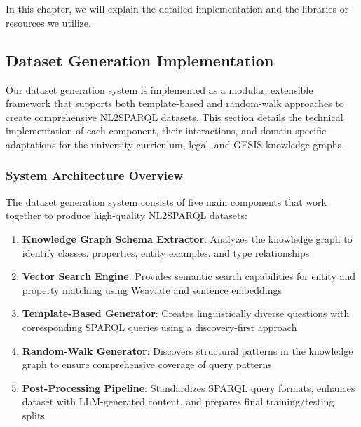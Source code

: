 \chapter{\babEmpat}
\label{bab:4}
In this chapter, we will explain the detailed implementation and the libraries or resources we utilize.

\section{Dataset Generation Implementation}

Our dataset generation system is implemented as a modular, extensible framework that supports both template-based and random-walk approaches to create comprehensive NL2SPARQL datasets. This section details the technical implementation of each component, their interactions, and domain-specific adaptations for the university curriculum, legal, and GESIS knowledge graphs.

\subsection{System Architecture Overview}

The dataset generation system consists of five main components that work together to produce high-quality NL2SPARQL datasets:

\begin{enumerate}
    \item \textbf{Knowledge Graph Schema Extractor}: Analyzes the knowledge graph to identify classes, properties, entity examples, and type relationships
    
    \item \textbf{Vector Search Engine}: Provides semantic search capabilities for entity and property matching using Weaviate and sentence embeddings
    
    \item \textbf{Template-Based Generator}: Creates linguistically diverse questions with corresponding SPARQL queries using a discovery-first approach
    
    \item \textbf{Random-Walk Generator}: Discovers structural patterns in the knowledge graph to ensure comprehensive coverage of query patterns
    
    \item \textbf{Post-Processing Pipeline}: Standardizes SPARQL query formats, enhances dataset with LLM-generated content, and prepares final training/testing splits
\end{enumerate}

